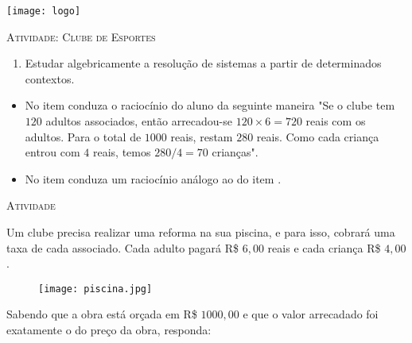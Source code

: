 \documentclass[10 pt,usenames,dvipsnames, oneside]{article}
\begin{document}
\begin{center}
  \begin{minipage}[l]{3cm}
\texttt{[image: logo]}    
\end{minipage}\hfill
\begin{minipage}[r]{.8\textwidth}
 {\Large \scshape Atividade: Clube de Esportes}  
\end{minipage}
\end{center}
\vspace{.2cm}

\ifdefined\prof

\begin{goals}
\begin{enumerate}
\item Estudar algebricamente a resolução de sistemas a partir de determinados contextos.
\end{enumerate}

\tcblower

\begin{itemize}
\item No item  conduza o raciocínio do aluno da seguinte maneira "Se o clube tem $120$ adultos associados, então arrecadou-se $120 \times 6 = 720$ reais com os adultos. Para o total de $1000$ reais, restam $280$ reais. Como cada criança entrou com $4$ reais, temos $280/4=70$ crianças".
\item No item  conduza um raciocínio análogo ao do item .
\end{itemize}
\end{goals}

\bigskip
\begin{center}
{\large \scshape Atividade}
\end{center}
\fi

Um clube precisa realizar uma reforma na sua piscina, e para isso, cobrará uma taxa de cada associado. Cada adulto pagará R\$ $6{,}00$ reais e cada criança R\$ $4{,}00$. 

\begin{figure}[H]
\centering

\noindent\texttt{[image: piscina.jpg]}
\end{figure}


Sabendo que a obra está orçada em R\$ $1000{,}00$ e que o valor arrecadado foi exatamente o do preço da obra, responda:
\end{document}
